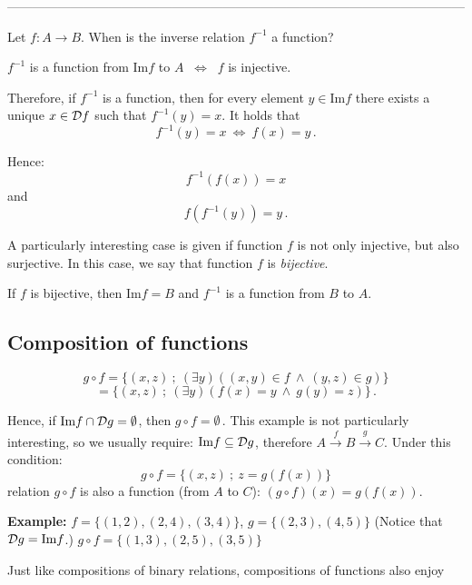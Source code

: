\documentclass[11pt,paper=b5,footinclude,headinclude]{scrbook} %
\def\inn {{~\wedge~}}
\def\cee {{~\Leftrightarrow~}}
\theoremstyle{remark}
\theoremstyle{definition} %
\theoremstyle{theorem} %
\begin{document}
------------------------------------------------------------------------------------------------------------

\bigskip

Let $f:A\to B$. When is the inverse relation $f^{-1}$ a function?

$f^{-1}$ is a function from $\textrm{Im}f$ to  $A$ $\cee$ $f$ is injective.



Therefore, if $f^{-1}$ is a function, then for every element
$y\in \textrm{Im}f$  there exists a unique $x\in {\cal D}f$ such that
$f^{-1}(y) = x$. It holds that
$$f^{-1}(y) = x\cee f(x) = y\,.$$

Hence: $$f^{-1}(f(x)) = x$$
and
$$f(f^{-1}(y)) = y\,.$$

A particularly interesting case is given if function $f$ is not only injective, but also surjective.
In this case, we say that function $f$ is {\em bijective}.

If $f$ is bijective, then  $\textrm{Im}f = B$ and $f^{-1}$ is a function from $B$ to $A$.


%

\subsection{Composition of functions}
$$g\circ f = \{(x,z)~;~(\exists y)((x,y)\in f\inn (y,z)\in g)\}$$
$$= \{(x,z)~;~(\exists y)(f(x) = y \inn g(y) = z)\}\,.$$

Hence, if $\textrm{Im}f\cap {\cal D}g = \emptyset$, then $g\circ f = \emptyset\,.$
This example is not particularly interesting, so we usually require: $\textrm{Im}f\subseteq {\cal D}g$,
therefore $A\overset{f}{\to} B\overset{g}{\to} C$.
Under this condition:
$$g\circ f = \{(x,z)~;~z = g(f(x))\}$$
relation $g\circ f$ is also a function (from $A$ to $C$): $(g\circ f)(x) = g(f(x))$.

\bigskip
\textbf{ Example:} $f = \{(1,2),(2,4),(3,4)\}$, $g = \{(2,3),(4,5)\}$
(Notice that ${\cal D}g = \textrm{Im}f$.)
$g\circ f = \{(1,3),(2,5), (3,5)\}$

\bigskip
Just like compositions of binary relations, compositions of functions also enjoy
\end{document}
